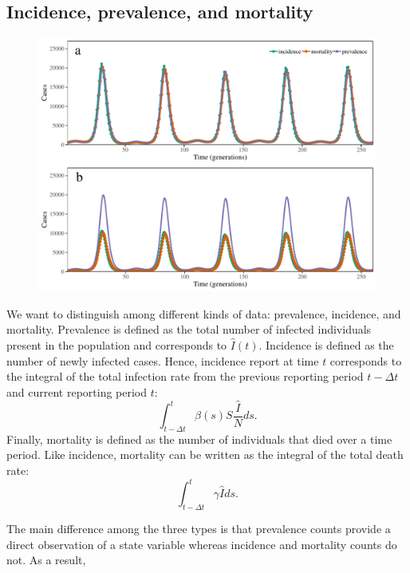 \documentclass{article}
\begin{document}
\subsection{Incidence, prevalence, and mortality}

\begin{figure}[t]
\includegraphics[width=\textwidth]{../figure/inc_prev_mort.pdf}
\end{figure}

We want to distinguish among different kinds of data: prevalence, incidence, and mortality.
Prevalence is defined as the total number of infected individuals present in the population and corresponds to $\hat{I}(t)$.
Incidence is defined as the number of newly infected cases. 
Hence, incidence report at time $t$ corresponds to the integral of the total infection rate from the previous reporting period $t - \Delta t$ and current reporting period $t$:
\begin{equation}
\int_{t-\Delta t}^{t} \beta(s) S \frac{\hat{I}}{N} ds.
\end{equation}
Finally, mortality is defined as the number of individuals that died over a time period.
Like incidence, mortality can be written as the integral of the total death rate:
\begin{equation}
\int_{t-\Delta t}^{t} \gamma \hat{I} ds.
\end{equation}

The main difference among the three types is that prevalence counts provide a direct observation of a state variable whereas incidence and mortality counts do not.
As a result, 
\end{document}
